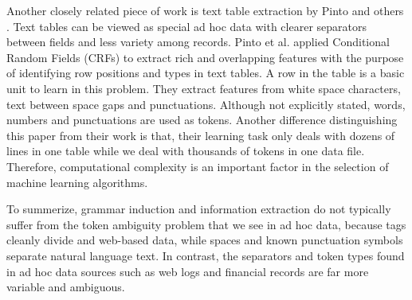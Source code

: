 Another closely related piece of work is text table extraction by
Pinto and others \cite{Pinto+:texttables}. Text tables can
be viewed as special ad hoc data with clearer separators between
fields and less variety among records. Pinto et al. applied
Conditional Random Fields (CRFs) to extract rich and overlapping features
with the purpose of identifying row positions and types in text
tables. A row in the table is a basic unit to learn in this
problem. They extract features from white space characters,
text between space gaps and punctuations. Although not explicitly
stated, words, numbers and punctuations are used as tokens. Another
difference distinguishing this paper from their work is that, their
learning task only deals with dozens of lines in one table while 
we deal with thousands of tokens in one data file. 
Therefore, computational complexity is an important factor in 
the selection of machine learning algorithms. 

To summerize, grammar induction and information extraction do not 
typically suffer from the token ambiguity problem that 
we see in ad hoc data, because tags cleanly divide \xml{} and web-based data, 
while spaces and known punctuation symbols separate natural language text.
In contrast, the separators and token types found in ad hoc data sources such as
web logs and financial records are far more variable and ambiguous.  


